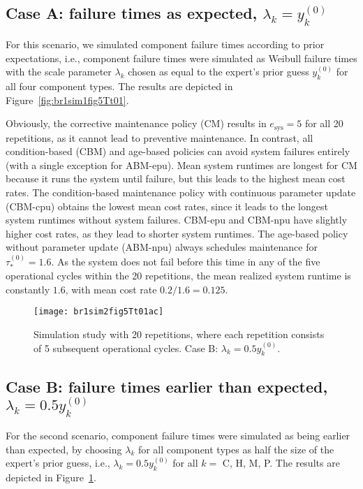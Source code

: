 \documentclass[authoryear]{elsarticle}
\newcommand{\uz}{^{(0)}} %
\def\ykz{y\uz_k}
\newcommand{\esys}{e_\text{sys}}
\begin{document}
\subsection{Case A: failure times as expected, $\lambda_k = \ykz$}
\label{sec:case1}

For this scenario, we simulated component failure times according to prior expectations,
i.e., component failure times were simulated as Weibull failure times
with the scale parameter $\lambda_k$ chosen as equal to the expert's prior guess $\ykz$
for all four component types.
The results are depicted in Figure~\ref{fig:br1sim1fig5Tt01}.

Obviously, the corrective maintenance policy (CM) results in $\esys = 5$ for all 20 repetitions,
as it cannot lead to preventive maintenance.
In contrast, all condition-based (CBM) and age-based policies can avoid system failures entirely (with a single exception for ABM-epu).
Mean system runtimes are longest for CM because it runs the system until failure,
but this leads to the highest mean cost rates.
The condition-based maintenance policy with continuous parameter update (CBM-cpu) obtains the lowest mean cost rates,
since it leads to the longest system runtimes without system failures.
CBM-epu and CBM-npu have slightly higher cost rates,
as they lead to shorter system runtimes.
The age-based policy without parameter update (ABM-npu)
always schedules maintenance for $\tau_*^{(0)} = 1.6$.
As the system does not fail before this time in any of the five operational cycles within the 20 repetitions,
the mean realized system runtime is constantly $1.6$, with mean cost rate $0.2 / 1.6 = 0.125$.

\begin{figure}
\texttt{[image: br1sim2fig5Tt01ac]}
\caption{Simulation study with 20 repetitions, where each repetition consists of 5 subsequent operational cycles.
Case B: $\lambda_k = 0.5\ykz$.}
\label{fig:br1sim2fig5Tt01}
\end{figure}

\subsection{Case B: failure times earlier than expected, $\lambda_k = 0.5 \ykz$}
\label{sec:case2}

For the second scenario,
component failure times were simulated as being earlier than expected,
by choosing $\lambda_k$ for all component types as half the size of the expert's prior guess,
i.e., $\lambda_k = 0.5 \ykz$ for all $k =$ C, H, M, P.
The results are depicted in Figure~\ref{fig:br1sim2fig5Tt01}.
\end{document}
